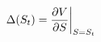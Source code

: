 \documentclass[preview]{standalone}
\begin{document}
\begin{align*}
\special{dvisvgm:raw <g id='unique000'>}\Delta(S_t) = \frac{\partial V}{\partial S}\bigg|_{S=S_t}\special{dvisvgm:raw </g>}
\end{align*}
\end{document}
